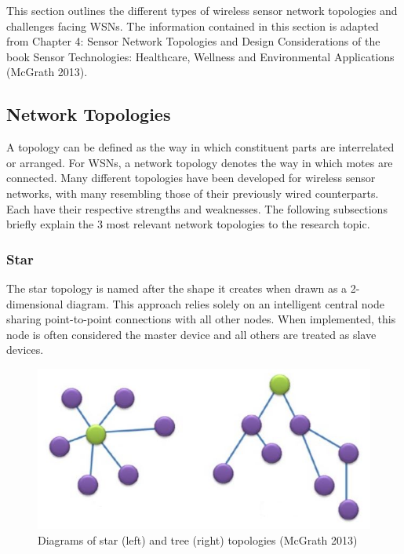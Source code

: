 This section outlines the different types of wireless sensor network topologies and challenges facing WSNs. The information contained in this section is adapted from Chapter 4: Sensor Network Topologies and Design Considerations of the book Sensor Technologies: Healthcare, Wellness and Environmental Applications (McGrath 2013).


\subsection{Network Topologies}

A topology can be defined as the way in which constituent parts are interrelated or arranged. For WSNs, a network topology denotes the way in which motes are connected. Many different topologies have been developed for wireless sensor networks, with many resembling those of their previously wired counterparts. Each have their respective strengths and weaknesses. The following subsections briefly explain the 3 most relevant network topologies to the research topic.


\subsubsection{Star}

The star topology is named after the shape it creates when drawn as a 2-dimensional diagram. This approach relies solely on an intelligent central node sharing point-to-point connections with all other nodes. When implemented, this node is often considered the master device and all others are treated as slave devices.

\begin{figure}[h]
\centering
\includegraphics{Figures/star-tree-topology.JPG}
\decoRule
\caption[Star and tree network topologies]{Diagrams of star (left) and tree (right) topologies (McGrath 2013)}
\label{fig:StarTreeTopology}
\end{figure}

